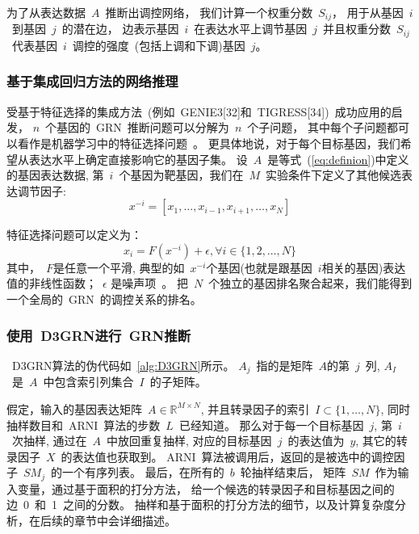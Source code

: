 为了从表达数据~$A$~推断出调控网络，
我们计算一个权重分数~$S_{ij}$，
用于从基因~$i$~到基因~$j$~的潜在边，
边表示基因~$i$~在表达水平上调节基因~$j$~并且权重分数~$S_{ij}$~代表基因~$i$~调控的强度~(包括上调和下调)基因~$j$。

\subsubsection{基于集成回归方法的网络推理}
受基于特征选择的集成方法~(例如~GENIE3[32]和~TIGRESS[34])~成功应用的启发，
$n$~个基因的~GRN~推断问题可以分解为~$n$~个子问题，
其中每个子问题都可以看作是机器学习中的特征选择问题~\cite{nasrabadi2007pattern}。
更具体地说，对于每个目标基因，我们希望从表达水平上确定直接影响它的基因子集。
设~$A$~是等式~(\ref{eq:definion})中定义的基因表达数据,
第~$i$~个基因为靶基因，我们在~$M$~实验条件下定义了其他候选表达调节因子:
\begin{equation}
  \label{eq:x}
  x^{-i} = [x_1,\ldots,x_{i-1},x_{i+1},\ldots,x_N]
  \end{equation}

特征选择问题可以定义为：
\begin{equation}
\label{eq:fs}
x_i =  F(x^{-i}) + \epsilon , \forall i \in \{1,2,\ldots,N\}
\end{equation}
其中，~$F$是任意一个平滑, 典型的如~$x^{-i}$个基因(也就是跟基因~$i$相关的基因)表达值的非线性函数；~$\epsilon$ 是噪声项~\cite{huynh2010inferring,Haury2012}。
把~$N$~个独立的基因排名聚合起来，我们能得到一个全局的~GRN~的调控关系的排名。

\subsubsection{使用~D3GRN进行~GRN推断}

~D3GRN算法的伪代码如~\ref{alg:D3GRN}所示。
$A_j$~指的是矩阵~$A$的第~$j$~列, 
$A_I$~是~$A$~中包含索引列集合~$I$~的子矩阵。

假定，输入的基因表达矩阵~$A \in \mathbb{R}^{M \times N}$, 
并且转录因子的索引~$I \subset \{1,\ldots,N\}$, 
同时抽样数目和~ARNI~算法的步数~$L$~已经知道。
那么对于每一个目标基因~$j$, 第~$i$~次抽样,
通过在~$A$~中放回重复抽样,
对应的目标基因~$j$~的表达值为~$y$, 
其它的转录因子~$X$~的表达值也获取到。
ARNI~算法被调用后，返回的是被选中的调控因子~$SM_j$~的一个有序列表。
最后，在所有的~$b$~轮抽样结束后，
矩阵~$SM$~作为输入变量，通过基于面积的打分方法，
给一个候选的转录因子和目标基因之间的边~0~和~1~之间的分数。
抽样和基于面积的打分方法的细节，以及计算复杂度分析，在后续的章节中会详细描述。
 

